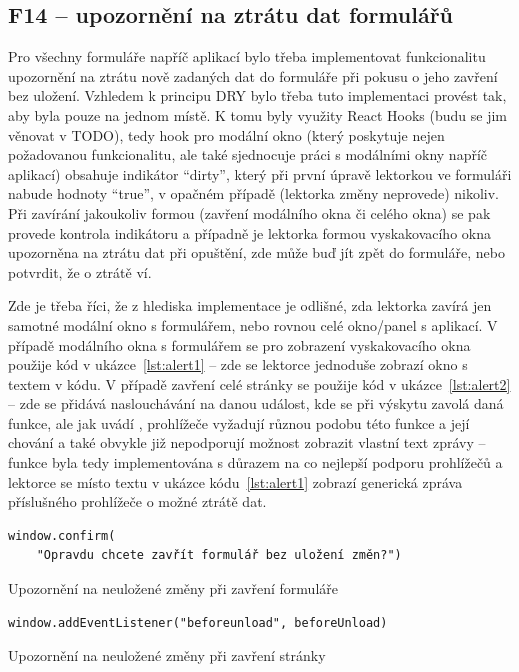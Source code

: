 \subsection{F14 -- upozornění na ztrátu dat formulářů}

Pro všechny formuláře napříč aplikací bylo třeba implementovat funkcionalitu upozornění na ztrátu nově zadaných dat do formuláře při pokusu o jeho zavření bez uložení. Vzhledem k principu DRY bylo třeba tuto implementaci provést tak, aby byla pouze na jednom místě. K tomu byly využity React Hooks (budu se jim věnovat v TODO), tedy hook pro modální okno (který poskytuje nejen požadovanou funkcionalitu, ale také sjednocuje práci s modálními okny napříč aplikací) obsahuje indikátor \enquote{dirty}, který při první úpravě lektorkou ve formuláři nabude hodnoty \enquote{true}, v opačném případě (lektorka změny neprovede) nikoliv. Při zavírání jakoukoliv formou (zavření modálního okna či celého okna) se pak provede kontrola indikátoru a případně je lektorka formou vyskakovacího okna upozorněna na ztrátu dat při opuštění, zde může buď jít zpět do formuláře, nebo potvrdit, že o ztrátě ví.

Zde je třeba říci, že z hlediska implementace je odlišné, zda lektorka zavírá jen samotné modální okno s formulářem, nebo rovnou celé okno/panel s aplikací. V případě modálního okna s formulářem se pro zobrazení vyskakovacího okna použije kód v ukázce~\ref{lst:alert1} -- zde se lektorce jednoduše zobrazí okno s textem v kódu. V případě zavření celé stránky se použije kód v ukázce~\ref{lst:alert2} -- zde se přidává naslouchávání na danou událost, kde se při výskytu zavolá daná funkce, ale jak uvádí \cite{mdn-beforeunload}, prohlížeče vyžadují různou podobu této funkce a její chování a také obvykle již nepodporují možnost zobrazit vlastní text zprávy -- funkce byla tedy implementována s důrazem na co nejlepší podporu prohlížečů a lektorce se místo textu v ukázce kódu~\ref{lst:alert1} zobrazí generická zpráva příslušného prohlížeče o možné ztrátě dat.

\begin{listing}[ht]
	\begin{verbatim}
window.confirm(
    "Opravdu chcete zavřít formulář bez uložení změn?")
	\end{verbatim}
	\caption{Upozornění na neuložené změny při zavření formuláře}\label{lst:alert1}
\end{listing}

\begin{listing}[ht]
	\begin{verbatim}
window.addEventListener("beforeunload", beforeUnload)
	\end{verbatim}
	\caption{Upozornění na neuložené změny při zavření stránky}\label{lst:alert2}
\end{listing}

